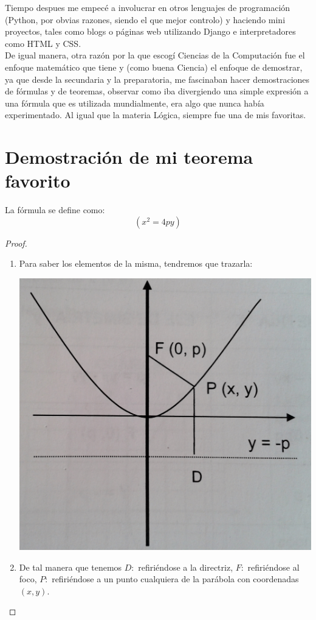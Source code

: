 Tiempo despues me empecé a involucrar en otros lenguajes de programación (Python, por obvias razones, siendo el que mejor controlo) y haciendo mini proyectos, tales
como blogs o páginas web utilizando Django e interpretadores como HTML y CSS.
\\

De igual manera, otra razón por la que escogí Ciencias de la Computación fue el enfoque matemático que tiene y (como buena Ciencia) el enfoque de demostrar, ya que
desde la secundaria y la preparatoria, me fascinaban hacer demostraciones de fórmulas y de teoremas, observar como iba divergiendo una simple expresión a una
fórmula que es utilizada mundialmente, era algo que nunca había experimentado. Al igual que la materia Lógica, siempre fue una de mis favoritas.
\\

\section{Demostración de mi teorema favorito}


\begin{teo}
  La fórmula se define como:
  \[
  \left(x^2=4py \right)
  \]
  
\end{teo}

\begin{proof}
  \begin{enumerate}
  \item Para saber los elementos de la misma, tendremos que trazarla:
  \begin{center}
   \includegraphics[scale=0.1]{Julian/parabola.jpg}
  \end{center}
\item De tal manera que tenemos $D:$ refiriéndose a la directriz, $F:$ refiriéndose al foco, $P:$ refiriéndose a un punto cualquiera de la parábola con coordenadas
  $(x,y)$. 
  \end{enumerate}
\end{proof}  


